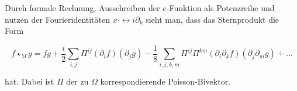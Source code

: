 Durch formale Rechnung, Ausschreiben der $e$-Funktion als Potenzreihe und nutzen der Fourieridentitäten $x \cdot \leftrightarrow i \partial_k$ sieht man, dass das Sternprodukt die Form

\begin{equation*}
    f \star_M g = fg + \frac{i}{2} \sum_{i,j} \Pi^{ij}(\partial_if)(\partial_jg) - \frac{1}{8}\sum_{i,j,k,m} \Pi^{ij} \Pi^{km} (\partial_i \partial_k f)(\partial_j \partial_m g) + \dots
\end{equation*}

hat. Dabei ist $\Pi$ der zu $\Omega$ korrespondierende Poisson-Bivektor.


